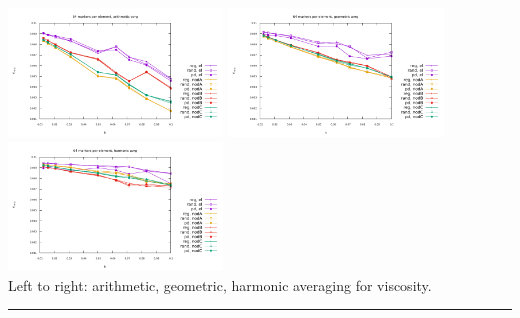 \begin{center}
\includegraphics[width=5.7cm]{python_codes/fieldstone_13/results/vrms_am} 
\includegraphics[width=5.7cm]{python_codes/fieldstone_13/results/vrms_gm} 
\includegraphics[width=5.7cm]{python_codes/fieldstone_13/results/vrms_hm}\\
{\captionfont Left to right: arithmetic, geometric, harmonic averaging for viscosity.}
\end{center}

\par\noindent\rule{\textwidth}{0.4pt}

\vspace{.5cm}

\begin{center}
\end{center}




